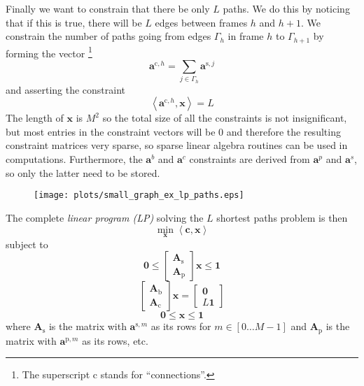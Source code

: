 \documentclass{article}
\newcommand{\TmpCapTitle}[0]{default}
\newcommand{\CaptionWithTitle}[2]{
    \renewcommand{\TmpCapTitle}[0]{\protect#1}
    \captionsetup{format=inc-cap-title}
    \caption[\protect#1.]{#2}
}
\def\figwidthscale{0.5}
\begin{document}
\begin{sloppy}
\[\]
Finally we want to constrain that there be only $L$ paths. We do this by
noticing that if this is true, there will be $L$ edges between frames $h$ and
$h+1$. We constrain the number of paths going from edges
$\Gamma_{h}$ in frame $h$ to $\Gamma_{h+1}$ by forming the vector
\footnote{The superscript c stands for ``connections''.}
\[
    \boldsymbol{a}^{\text{c},h} = \sum_{j \in \Gamma_{h}}
    \boldsymbol{a}^{\text{s},j}
\]
and asserting the constraint
\[
    \left\langle \boldsymbol{a}^{\text{c},h} , \boldsymbol{x} \right\rangle = L
\]
The length of $\boldsymbol{x}$ is $M^{2}$ so the total size of all the
constraints is not insignificant, but most entries in the constraint vectors will
be 0 and therefore the resulting constraint matrices very sparse, so sparse
linear algebra routines can be used in computations. Furthermore, the
$\boldsymbol{a}^{b}$ and $\boldsymbol{a}^{c}$ constraints are derived from
$\boldsymbol{a}^{p}$ and $\boldsymbol{a}^{s}$, so only the latter need to be
stored.

\begin{figure}[!t]
    \centering
    \centerline{\texttt{[image: plots/small\_graph\_ex\_lp\_paths.eps]}}
    \CaptionWithTitle{%
    }{\label{plot:simple_graph_lp_paths}}
\end{figure}

The complete \textit{linear program (LP)} solving the $L$ shortest paths problem is then
\[
    \min_{\boldsymbol{x}} \left\langle \boldsymbol{c}, \boldsymbol{x} \right\rangle
\]
subject to
\[
    \boldsymbol{0} \leq
    \begin{bmatrix}
        \boldsymbol{A}_{\text{s}} \\
        \boldsymbol{A}_{\text{p}}
    \end{bmatrix} \boldsymbol{x}
    \leq \boldsymbol{1}
\]
\[
    \begin{bmatrix}
        \boldsymbol{A}_{\text{b}} \\
        \boldsymbol{A}_{\text{c}}
    \end{bmatrix}
    \boldsymbol{x}
    =
    \begin{bmatrix}
        \boldsymbol{0} \\
        L\boldsymbol{1}
    \end{bmatrix}
\]
\[
    \boldsymbol{0} \leq \boldsymbol{x} \leq \boldsymbol{1}
\]
where $\boldsymbol{A}_{\text{s}}$ is the matrix with
$\boldsymbol{a}^{\text{s},m}$ as its rows for $m \in [0 \dotsc M-1]$ and
$\boldsymbol{A}_{\text{p}}$ is the matrix with $\boldsymbol{a}^{\text{p},m}$ as
its rows, etc.


\end{sloppy}
\end{document}
